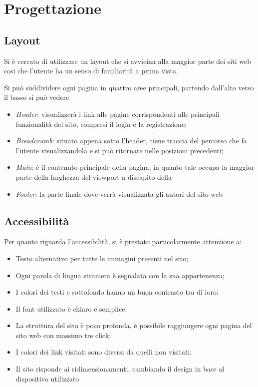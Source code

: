 \section{Progettazione}

\subsection{Layout}

Si è cercato di utilizzare un layout che si avvicina alla maggior parte dei 
siti web cosi che l'utente ha un senso di familiarità a prima vista.

Si può suddividere ogni pagina in quattro aree principali, 
partendo dall'alto verso il basso si può vedere

\begin{itemize}
	\item \textit{Header}:  visualizzerà i link alle pagine
	corrispondenti alle principali funzionalità del sito, compresi il login e la registrazione;
	\item \textit{Breadcrumb}: situato appena sotto l'header, tiene traccia del 
	percorso che fa l'utente visualizzandola e si può ritornare nelle posizioni precedenti;
	\item \textit{Main}: è il contenuto principale della pagina; in quanto
	tale occupa la maggior parte della larghezza del viewport a discapito
	della
	\item \textit{Footer}: la parte finale dove verrà visualizzata gli autori del sito web
\end{itemize}

\subsection{Accessibilità}

Per quanto riguarda l'accessibilità, si è prestato particolarmente attenzione a:

\begin{itemize}
	\item Testo alternativo per tutte le immagini presenti nel sito;
	\item Ogni parola di lingua straniera è segnalata con la sua appartenenza;
	\item I colori dei testi e sottofondo hanno un buon contrasto tra di loro;
	\item Il font utilizzato è chiaro e semplice;
	\item La struttura del sito è poco profonda, è possibile raggiungere ogni pagina
	del sito web con massimo tre click;
	\item I colori dei link visitati sono diversi da quelli non visitati;
	\item Il sito risponde ai ridimensionamenti, cambiando il design in base al dispositivo utilizzato
\end{itemize}

